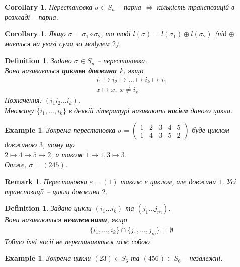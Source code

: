\documentclass[a4paper, 10pt]{article}
\theoremstyle{theoremdd}
\theoremstyle{theoremdd}
\newtheorem{definition}[theorem]{Definition}
\theoremstyle{theoremdd}
\theoremstyle{theoremdd}
\theoremstyle{theoremdd}
\newtheorem{example}[theorem]{Example}
\theoremstyle{theoremdd}
\theoremstyle{theoremdd}
\theoremstyle{theoremdd}
\theoremstyle{theoremdd}
\theoremstyle{theoremdd}
\theoremstyle{theoremdd}
\newtheorem{remark}[theorem]{Remark}
\theoremstyle{theoremdd}
\theoremstyle{theoremdd}
\theoremstyle{theoremdd}
\newtheorem{corollary}[theorem]{Corollary}
\theoremstyle{theoremdd}
\begin{document}
\begin{corollary}
Перестановка $\sigma \in S_n$ -- парна $\iff$ кількість транспозицій в розкладі -- парна.
\end{corollary}

\begin{corollary}
Якщо $\sigma = \sigma_1 \circ \sigma_2$, то тоді $l(\sigma) = l(\sigma_1) \oplus l(\sigma_2)$ (під $\oplus$ мається на увазі сума за модулем $2$).
\end{corollary}

\begin{definition}
Задано $\sigma \in S_n$ -- перестановка.\\
Вона називається \textbf{циклом довжини $k$}, якщо
\begin{align*}
i_1 \mapsto i_2 \mapsto \dots \mapsto i_k \mapsto i_1 \\
x \mapsto x,\ x \neq i_s
\end{align*}
Позначення: $(i_1 i_2 \dots i_k)$.\\
Множину $\{i_1,\dots,i_k\}$ в деякій літературі називають \textbf{носієм} даного цикла.
\end{definition}


\begin{example}
Зокрема перестановка $\sigma = \begin{pmatrix}
1 & 2 & 3 & 4 & 5 \\
1 & 4 & 3 & 5 & 2 
\end{pmatrix}$ буде циклом довжиною $3$, тому що\\
$2 \mapsto 4 \mapsto 5 \mapsto 2$, а також $1 \mapsto 1, 3 \mapsto 3$.\\
Отже, $\sigma = (245)$.
\end{example}

\begin{remark}
Перестановка $\varepsilon = (1)$ також є циклом, але довжини $1$. Усі транспозиції -- цикли довжини $2$.
\end{remark}

\begin{definition}
Задано цикли $(i_1 \dots i_k)$ та $(j_1 \dots j_m)$.\\
Вони називаються \textbf{незалежними}, якщо
\begin{align*}
\{i_1,\dots,i_k\} \cap \{j_1,\dots,j_m\} = \emptyset
\end{align*}
Тобто їхні носії не перетинаються між собою.
\end{definition}

\begin{example}
Зокрема цикли $(23) \in S_6$ та $(456) \in S_6$ -- незалежні.
\end{example}
\end{document}
